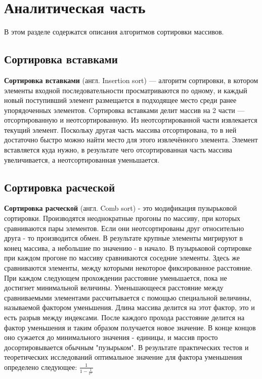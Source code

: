 \documentclass[a4paper,12pt]{report}
\begin{document}
\chapter{Аналитическая часть}
\hspace{0.6cm}В этом разделе содержатся описания алгоритмов сортировки массивов.

\section{Сортировка вставками}
\hspace{0.6cm} \textbf{Сортировка вставками} (англ. Insertion sort) — алгоритм сортировки, в котором элементы входной последовательности просматриваются по одному, и каждый новый поступивший элемент размещается в подходящее место среди ранее упорядоченных элементов.
Cортировка вставками делит массив на 2 части — отсортированную и неотсортированную. Из неотсортированной части извлекается текущий элемент. Поскольку другая часть массива отсортирована, то в ней достаточно быстро можно найти место для этого извлечённого элемента. Элемент вставляется куда нужно, в результате чего отсортированная часть массива увеличивается, а неотсортированная уменьшается.

\section{Сортировка расческой}
\hspace{0.6cm} \textbf{Сортировка расческой} (англ. Comb sort) - это модификация пузырьковой сортировки. Производятся неоднократные прогоны по массиву, при которых сравниваются пары элементов. Если они неотсортированы друг относительно друга - то производится обмен. В результате крупные элементы мигрируют в конец массива, а небольшие по значению - в начало.
В пузырьковой сортировке при каждом прогоне по массиву сравниваются соседние элементы. Здесь же сравниваются элементы, между которыми некоторое фиксированное расстояние. При каждом следующем прохождении расстояние уменьшается, пока не достигнет минимальной величины.
Уменьшающееся расстояние между сравниваемыми элементами рассчитывается с помощью специальной величины, называемой фактором уменьшения. Длина массива делится на этот фактор, это и есть разрыв между индексами. После каждого прохода расстояние делится на фактор уменьшения и таким образом получается новое значение. В конце концов оно сужается до минимального значения - единицы, и массив просто досортировывается обычным "пузырьком".
В результате практических тестов и теоретических исследований оптимальное значение для фактора уменьшения определено следующее: $\frac{1}{1 - \frac{1}{e^{\varphi}}}$
\end{document}
